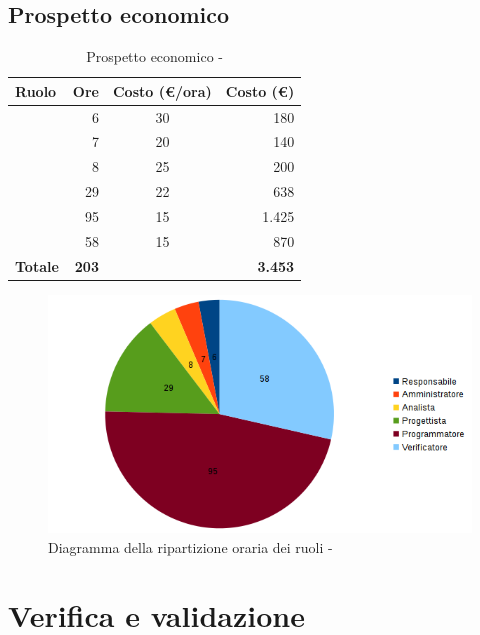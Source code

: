 \documentclass[12pt,a4paper]{article}
\begin{document}
\subsection{Prospetto economico}

\begin{table}[H]
	\begin{center}
		\begin{tabular}{l r c r}
			\toprule
			\textbf{Ruolo}	& \textbf{Ore} & \textbf{Costo (\euro/ora)}	& \textbf{Costo (\euro)} \\ \midrule
			\midrule
			\RE & 6 & 30 & 180 \\ \midrule
			\AM & 7 & 20 & 140 \\ \midrule
			\AN & 8 & 25 & 200 \\ \midrule
			\PG & 29 & 22 & 638 \\ \midrule
			\PR & 95 & 15 & 1.425 \\ \midrule
			\VR & 58 & 15 & 870 \\ \midrule
			\textbf{Totale} & \textbf{203} &  & \textbf{3.453} \\
			\bottomrule
		\end{tabular}
		\caption{Prospetto economico - \FPDC}
	\end{center}
\end{table}

\begin{center}
	\begin{figure}[H]
		\centering
		\includegraphics[width=\textwidth]{diagrammaTortaProgettazioneDettaglioCodificaTotaleOre.png}
		\caption{Diagramma della ripartizione oraria dei ruoli - \FPDC}
	\end{figure}
\end{center}

\newpage
\section{Verifica e validazione} %
\end{document}

